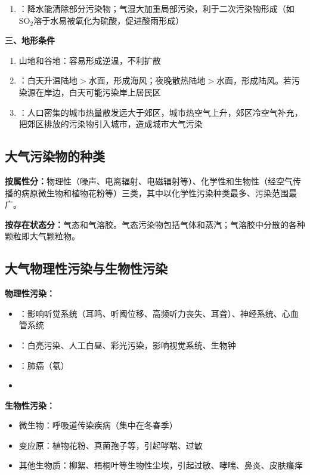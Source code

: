 \documentclass[10pt,a4paper,oneside]{ctexbook}
\begin{document}
\begin{keybox}
\begin{enumerate}[leftmargin=*]
    \item {}：降水能清除部分污染物；气湿大加重局部污染，利于二次污染物形成（如SO$_2$溶于水易被氧化为硫酸，促进酸雨形成）
\end{enumerate}

\textbf{三、地形条件}
\begin{enumerate}[leftmargin=*]
    \item 山地和谷地：容易形成逆温，不利扩散
    \item {}：白天升温陆地$>$水面，形成海风；夜晚散热陆地$>$水面，形成陆风。若污染源在岸边，白天可能污染岸上居民区
    \item {}：人口密集的城市热量散发远大于郊区，城市热空气上升，郊区冷空气补充，把郊区排放的污染物引入城市，造成城市大气污染
\end{enumerate}
\end{keybox}

\subsection{大气污染物的种类}

\textbf{按属性分：}物理性（噪声、电离辐射、电磁辐射等）、化学性和生物性（经空气传播的病原微生物和植物花粉等）三类，其中以化学性污染种类最多、污染范围最广。

\textbf{按存在状态分：}气态和气溶胶。气态污染物包括气体和蒸汽；气溶胶中分散的各种颗粒即大气颗粒物。

\subsection{大气物理性污染与生物性污染}

\begin{defbox}
\textbf{物理性污染：}
\begin{itemize}[leftmargin=*]
    \item {}：影响听觉系统（耳鸣、听阈位移、高频听力丧失、耳聋）、神经系统、心血管系统
    \item {}：白亮污染、人工白昼、彩光污染，影响视觉系统、生物钟
    \item {}：肺癌（氡）
    \item {}
\end{itemize}

\textbf{生物性污染：}
\begin{itemize}[leftmargin=*]
    \item 微生物：呼吸道传染疾病（集中在冬春季）
    \item 变应原：植物花粉、真菌孢子等，引起哮喘、过敏
    \item 其他生物质：柳絮、梧桐叶等生物性尘埃，引起过敏、哮喘、鼻炎、皮肤瘙痒
\end{itemize}
\end{defbox}
\end{document}
